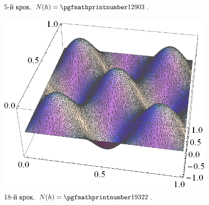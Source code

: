 \begin{frame}[allowframebreaks]
\begin{figure}[H]
\begin{columns}
\begin{column}{0.7\textwidth}
			 	 \end{column}
			     \begin{column}{0.3\textwidth}
			     	\caption*{5-й крок. $N(h) = \nn{12903}$.}
			     \end{column}
		     \end{columns}
		\end{figure}
		\begin{figure}[H]
			\begin{columns}
			 	\begin{column}{0.7\textwidth}
			 		\includegraphics[width=\textwidth]{problem1/my/solutions/18}
			 	 \end{column}
			     \begin{column}{0.3\textwidth}
			     	\caption*{18-й крок. $N(h) = \nn{19322}$.}
			     \end{column}
		     \end{columns}
		\end{figure}
\end{frame}



